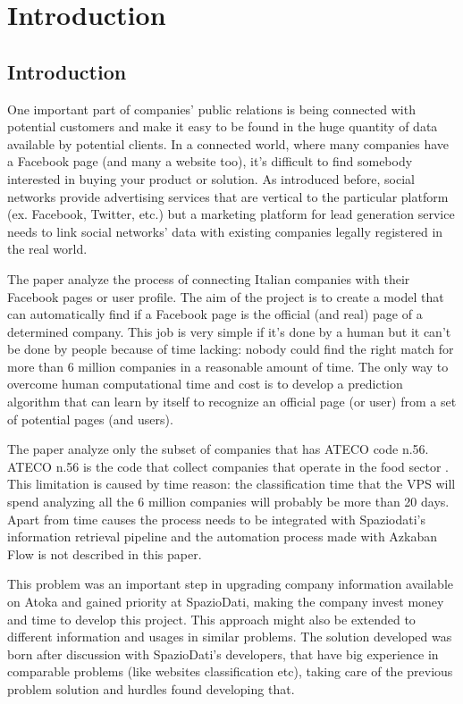 \chapter{Introduction} %

\section{Introduction}
One important part of companies' public relations is being connected with potential customers and make it easy to be found in the huge quantity of data available by potential clients. In a connected world, where many companies have a Facebook page (and many a website too), it's difficult to find somebody interested in buying your product or solution. As introduced before, social networks provide advertising services that are vertical to the particular platform (ex. Facebook, Twitter, etc.) but a marketing platform for lead generation service needs to link social networks' data with existing companies legally registered in the real world.

The paper analyze the process of connecting Italian companies with their Facebook pages or user profile.
The aim of the project is to create a model that can automatically find if a Facebook page is the official (and real) page of a determined company. This job is very simple if it's done by a human but it can't be done by people because of time lacking: nobody could find the right match for more than 6 million companies in a reasonable amount of time. The only way to overcome human computational time and cost is to develop a prediction algorithm that can learn by itself to recognize an official page (or user) from a set of potential pages (and users).

The paper analyze only the subset of companies that has ATECO code n.56. ATECO n.56 is the code that collect companies that operate in the food sector
. This limitation is caused by time reason: the classification time that the VPS will spend analyzing all the 6 million companies will probably be more than 20 days. Apart from time causes the process needs to be integrated with Spaziodati's information retrieval pipeline and the automation process made with Azkaban Flow is not described in this paper.

This problem was an important step in upgrading company information available on Atoka and gained priority at SpazioDati, making the company invest money and time to develop this project. This approach might also be extended to different information and usages in similar problems.
The solution developed was born after discussion with SpazioDati's developers, that have big experience in comparable problems (like websites classification etc), taking care of the previous problem solution and hurdles found developing that.

